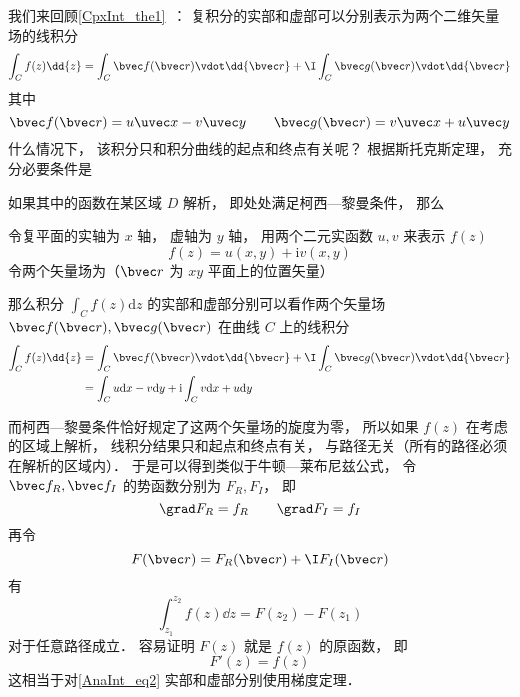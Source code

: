 
\begin{issues}
\issueDraft
\end{issues}


我们来回顾\autoref{CpxInt_the1}~： 复积分的实部和虚部可以分别表示为两个二维矢量场的线积分
\begin{equation}
\int_{C} f(z) \dd{z} = \int_C \bvec f(\bvec r) \vdot \dd{\bvec r} + \I \int_C \bvec g(\bvec r) \vdot \dd{\bvec r}
\end{equation}
其中
\begin{equation}
\bvec f(\bvec r) = u\uvec x - v\uvec y
\qquad
\bvec g(\bvec r) = v\uvec x + u\uvec y
\end{equation}
什么情况下， 该积分只和积分曲线的起点和终点有关呢？ 根据斯托克斯定理， 充分必要条件是


如果其中的函数在某区域 $D$ 解析， 即处处满足柯西—黎曼条件， 那么


\begin{theorem}{}
令复平面的实轴为 $x$ 轴， 虚轴为 $y$ 轴， 用两个二元实函数 $u, v$ 来表示 $f(z)$
\begin{equation}
f (z) = u(x, y) + \mathrm iv(x, y)
\end{equation}
令两个矢量场为（$\bvec r$ 为 $xy$ 平面上的位置矢量）

那么积分 $\int_{C} f(z) \mathrm{d} z$ 的实部和虚部分别可以看作两个矢量场 $\bvec f(\bvec r), \bvec g(\bvec r)$ 在曲线 $C$ 上的线积分
\begin{equation}
\begin{aligned}
\int_{C} f(z) \dd{z} &= \int_C \bvec f(\bvec r) \vdot \dd{\bvec r} + \I \int_C \bvec g(\bvec r) \vdot \dd{\bvec r}\\
&= \int_{C} u \mathrm{d} x-v \mathrm{d} y+\mathrm{i} \int_{C} v \mathrm{d} x+u \mathrm{d} y
\end{aligned}
\end{equation}
\end{theorem}

而柯西—黎曼条件恰好规定了这两个矢量场的旋度为零， 所以如果 $f(z)$ 在考虑的区域上解析， 线积分结果只和起点和终点有关， 与路径无关（所有的路径必须在解析的区域内）． 于是可以得到类似于牛顿—莱布尼兹公式， 令 $\bvec f_R, \bvec f_I$ 的势函数分别为 $F_R, F_I$， 即
\begin{equation}
\grad F_R = f_R
\qquad
\grad F_I = f_I
\end{equation}
再令
\begin{equation}
F(\bvec r) = F_R(\bvec r) + \I F_I(\bvec r)
\end{equation}
有
\begin{equation}\label{AnaInt_eq2}
\int_{z_1}^{z_2} f(z) \dd{z} = F(z_2) - F(z_1)
\end{equation}
对于任意路径成立． 容易证明 $F(z)$ 就是 $f(z)$ 的原函数， 即
\begin{equation}
F'(z) = f(z)
\end{equation}
这相当于对\autoref{AnaInt_eq2} 实部和虚部分别使用梯度定理．
